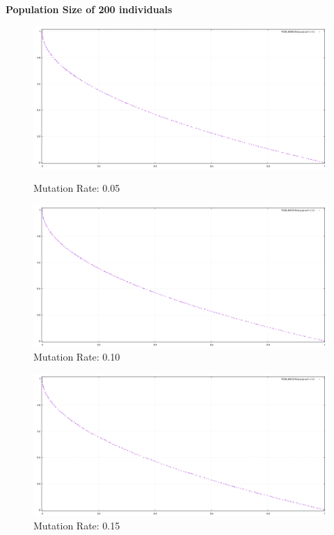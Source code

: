 \documentclass{article}
\begin{document}
\newpage

\textbf{Population Size of 200 individuals}
\begin{figure}[h]
    \centering
    \begin{minipage}{0.49\textwidth}
        \includegraphics[width=\linewidth]{population_plot/P200_M005.png}
        \caption{Mutation Rate: 0.05}
        \label{fig:P200_M005}
    \end{minipage}
    \hfill
    \begin{minipage}{0.49\textwidth}
        \includegraphics[width=\linewidth]{population_plot/P200_M010.png}
        \caption{Mutation Rate: 0.10}
        \label{fig:P200_M010}
    \end{minipage}
\end{figure}

\begin{figure}[h]
    \centering
    \includegraphics[width=0.49\linewidth]{population_plot/P200_M015.png}
    \caption{Mutation Rate: 0.15}
    \label{fig:P200_M015}
\end{figure}
\end{document}
